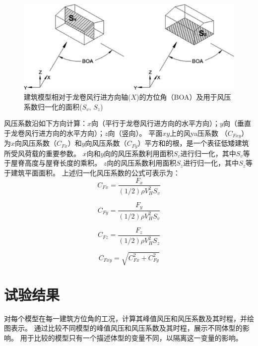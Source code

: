 \documentclass{ctexart}
\begin{document}
\begin{figure}
\centering
\includegraphics{./fig/3}
\caption{建筑模型相对于龙卷风行进方向轴($X$)的方位角（BOA）及用于风压系数归一化的面积($S_v$, $S_z$)}
\label{fig:BOA}
\end{figure}


风压系数沿如下方向计算：$x$向（平行于龙卷风行进方向的水平方向）；$y$向（垂直于龙卷风行进方向的水平方向）；$z$向（竖向）。
平面$xy$上的风ya压系数 （$C_{Fxy}$）为$x$向风压系数（$C_{Fx}$）和$y$向风压系数（$C_{Fy}$）平方和的根，是一个表征低矮建筑所受风荷载的重要参数。
$x$向和$y$向的风压系数利用面积$S_v$进行归一化，其中$S_v$等于屋脊高度与屋脊长度的乘积。
$z$向的风压系数利用面积$S_z$进行归一化，其中$S_z$等于建筑平面面积。
上述归一化风压系数的公式可表示为：
\begin{equation}
	C_{Fx}=\frac{F_x}{(1/2)\rho V_H^2 S_v}
\end{equation}

\begin{equation}
	C_{Fy}=\frac{F_y}{(1/2)\rho V_H^2 S_v}
\end{equation}

\begin{equation}
	C_{Fz}=\frac{F_z}{(1/2)\rho V_H^2 S_z}
\end{equation}

\begin{equation}
	C_{Fxy}=\sqrt{C_{Fx}^2+C_{Fy}^2}
\end{equation}

\section{试验结果}
对每个模型在每一建筑方位角的工况，计算其峰值风压和风压系数及其时程，并绘图表示。
通过比较不同模型的峰值风压和风压系数及其时程，展示不同体型的影响。
用于比较的模型只有一个描述体型的变量不同，以隔离这一变量的影响。
\end{document}
